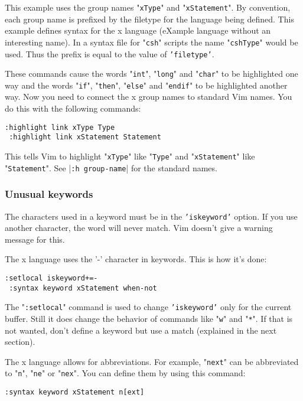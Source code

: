 This example uses the group names "\texttt{xType}" and "\texttt{xStatement}".
By convention, each group name is prefixed by the filetype for the language being defined.
This example defines syntax for the x language (eXample language without an interesting name).
In a syntax file for "\texttt{csh}" scripts the name "\texttt{cshType}" would be used.
Thus the prefix is equal to the value of \texttt{'filetype'}.

These commands cause the words "\texttt{int}", "\texttt{long}" and "\texttt{char}" to be highlighted one way and the words "\texttt{if}", "\texttt{then}", "\texttt{else}" and "\texttt{endif}" to be highlighted another way.
Now you need to connect the x group names to standard Vim names.
You do this with the following commands:

\begin{Verbatim}[samepage=true]
 :highlight link xType Type
 :highlight link xStatement Statement
\end{Verbatim}

This tells Vim to highlight "\texttt{xType}" like "\texttt{Type}" and "\texttt{xStatement}" like "\texttt{Statement}".
See |\texttt{:h group-name}| for the standard names.

\subsubsection{Unusual keywords}
The characters used in a keyword must be in the \texttt{'iskeyword'} option.
If you use another character, the word will never match.
Vim doesn't give a warning message for this.

The x language uses the '-' character in keywords.
This is how it's done:

\begin{Verbatim}[samepage=true]
 :setlocal iskeyword+=-
 :syntax keyword xStatement when-not
\end{Verbatim}

The "\texttt{:setlocal}" command is used to change \texttt{'iskeyword'} only for the current buffer.
Still it does change the behavior of commands like "\texttt{w}" and "\texttt{*}".
If that is not wanted, don't define a keyword but use a match (explained in the next section).

The x language allows for abbreviations.
For example, "\texttt{next}" can be abbreviated to "\texttt{n}", "\texttt{ne}" or "\texttt{nex}".
You can define them by using this command:

\begin{Verbatim}[samepage=true]
 :syntax keyword xStatement n[ext]
\end{Verbatim}

